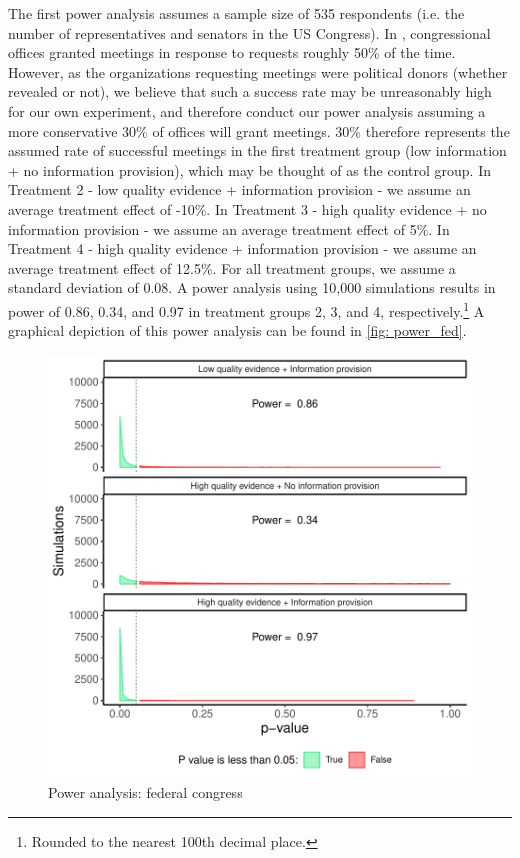 \documentclass[12pt,final,fleqn]{article}
\theoremstyle{plain}
\begin{document}
The first power analysis assumes a sample size of 535 respondents (i.e. the number of representatives and senators in the US Congress). In \citet{kalla2016campaign}, congressional offices granted meetings in response to requests roughly 50\% of the time. However, as the organizations requesting meetings were political donors (whether revealed or not), we believe that such a success rate may be unreasonably high for our own experiment, and therefore conduct our power analysis assuming a more conservative 30\% of offices will grant meetings. 30\% therefore represents the assumed rate of successful meetings in the first treatment group (low information + no information provision), which may be thought of as the control group. In Treatment 2 - low quality evidence + information provision - we assume an average treatment effect of -10\%. In Treatment 3 - high quality evidence + no information provision - we assume an average treatment effect of 5\%. In Treatment 4 - high quality evidence + information provision - we assume an average treatment effect of 12.5\%. For all treatment groups, we assume a standard deviation of 0.08. A power analysis using 10,000 simulations results in power of 0.86, 0.34, and 0.97 in treatment groups 2, 3, and 4, respectively.\footnote{Rounded to the nearest 100th decimal place.} A graphical depiction of this power analysis can be found in \autoref{fig: power_fed}.

\begin{figure}[!htb]
\includegraphics{../figs/power_fed.pdf}
\bigbreak
\caption{Power analysis: federal congress}
\label{fig: power_fed}
\end{figure}
\end{document}
